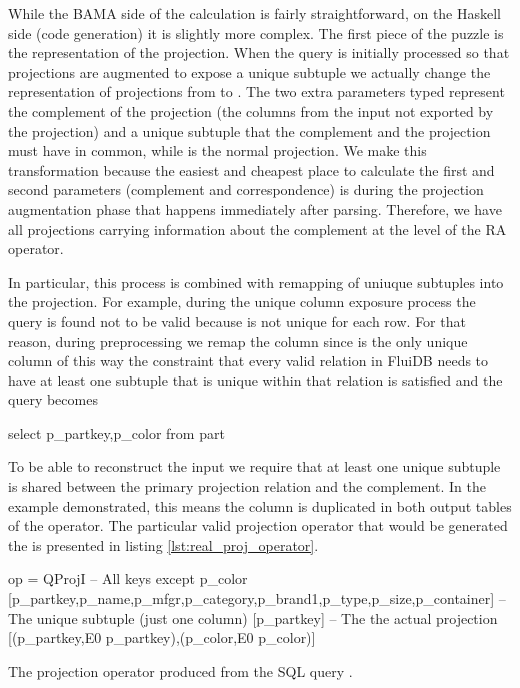 While the BAMA side of the calculation is fairly straightforward, on
the Haskell side (code generation) it is slightly more complex. The
first piece of the puzzle is the representation of the
projection. When the query is initially processed so that projections
are augmented to expose a unique subtuple we actually change the
representation of projections from  to
. The two extra parameters typed
\hask{[e]} represent the complement of the projection (the columns
from the input not exported by the projection) and a unique subtuple
that the complement and the projection must have in common, while
\hask{[(e,Expr e)]} is the normal projection. We make this
transformation because the easiest and cheapest place to calculate the
first and second parameters (complement and correspondence) is during
the projection augmentation phase that happens immediately after
parsing. Therefore, we have all projections carrying information about the
complement at the level of the RA operator.

In particular, this process is combined with remapping of uniuque
subtuples into the projection. For example, during the unique column
exposure process the query  is found not
to be valid because  is not unique for each row. For that
reason, during preprocessing we remap the  column since
 is the only unique column of  this way the
constraint that every valid relation in FluiDB needs to have at least
one subtuple that is unique within that relation is satisfied and the
query becomes

\begin{sqlcode}
select p_partkey,p_color from part
\end{sqlcode}

To be able to reconstruct the input we require that at least
one unique subtuple is shared between the primary projection relation
and the complement. In the example demonstrated, this means the
 column is duplicated in both output tables of the
operator. The particular valid projection operator that would be
generated the  is presented in listing
\ref{lst:real_proj_operator}.

\begin{code}
\begin{haskellcode}
op =
  QProjI
    -- All keys except p_color
    [p_partkey,p_name,p_mfgr,p_category,p_brand1,p_type,p_size,p_container]
    -- The unique subtuple (just one column)
    [p_partkey]
    -- The the actual projection
    [(p_partkey,E0 p_partkey),(p_color,E0 p_color)]
\end{haskellcode}
  \caption{\label{lst:real_proj_operator}The projection operator
    produced from the SQL query .}
\end{code}

